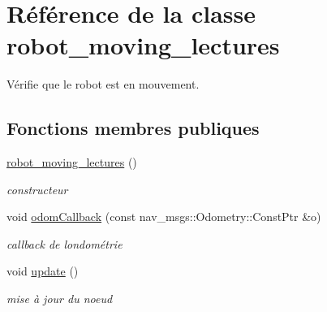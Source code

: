 \hypertarget{classrobot__moving__lectures}{}\section{Référence de la classe robot\+\_\+moving\+\_\+lectures}
\label{classrobot__moving__lectures}


Vérifie que le robot est en mouvement.  


\subsection*{Fonctions membres publiques}
\begin{DoxyCompactItemize}
\item 
\hyperlink{classrobot__moving__lectures_a8478ab9f406be0e791438c0df17b2516}{robot\+\_\+moving\+\_\+lectures} ()
\begin{DoxyCompactList}\small\item\em constructeur \end{DoxyCompactList}\item 
void \hyperlink{classrobot__moving__lectures_a3dff7330383e900e6c7885241cc5d8a9}{odom\+Callback} (const nav\+\_\+msgs\+::\+Odometry\+::\+Const\+Ptr \&o)
\begin{DoxyCompactList}\small\item\em callback de l\textquotesingle{}ondométrie \end{DoxyCompactList}\item 
void \hyperlink{classrobot__moving__lectures_a3456c6058e70f014540d76fd92f943ab}{update} ()
\begin{DoxyCompactList}\small\item\em mise à jour du noeud \end{DoxyCompactList}\end{DoxyCompactItemize}
